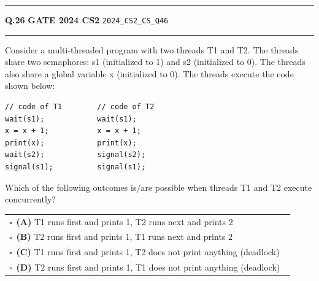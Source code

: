 \documentclass[a4paper,10pt]{article}
\begin{document}
\vspace{6pt}\hrule height 0.35pt\vspace{6pt}
\noindent
\begin{tcolorbox}[
    blanker,
    sidebyside,
    sidebyside align=top,
    lefthand width=0.55\textwidth,
    top=4pt, bottom=4pt, left=0pt, right=0pt,
    middle=16pt,
    underlay={
        \draw[dashed, black!80, line width=0.8pt, dash pattern=on 4pt off 3pt]
            ([xshift=0.55\textwidth+8pt]frame.north west) --
            ([xshift=0.55\textwidth+8pt]frame.south west);
    }
]
\textbf{Q.26}  \hfill {\footnotesize\textbf{GATE 2024 CS2} \quad \tiny\texttt{2024\_CS2\_CS\_Q46}}
\vspace{2pt}\hrule height 0.3pt\vspace{4pt}

Consider a multi-threaded program with two threads T1 and T2. The threads share two semaphores: s1 (initialized to 1) and s2 (initialized to 0). The threads also share a global variable x (initialized to 0). The threads execute the code shown below:
\begin{verbatim}
// code of T1        // code of T2
wait(s1);            wait(s1);
x = x + 1;           x = x + 1;
print(x);            print(x);
wait(s2);            signal(s2);
signal(s1);          signal(s1);
\end{verbatim}
Which of the following outcomes is/are possible when threads T1 and T2 execute concurrently?

\par\vspace{6pt}\noindent
\begin{tabular}{@{}p{0.98\linewidth}@{}}
$\square$\ \textbf{(A)} T1 runs first and prints 1, T2 runs next and prints 2 \\
\addlinespace[3pt]
$\square$\ \textbf{(B)} T2 runs first and prints 1, T1 runs next and prints 2 \\
\addlinespace[3pt]
$\square$\ \textbf{(C)} T1 runs first and prints 1, T2 does not print anything (deadlock) \\
\addlinespace[3pt]
$\square$\ \textbf{(D)} T2 runs first and prints 1, T1 does not print anything (deadlock)
\end{tabular}

\tcblower


\end{tcolorbox}
\end{document}
